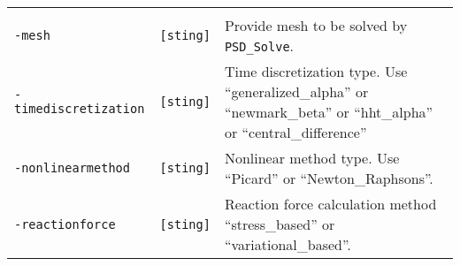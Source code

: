 \begin{longtable}[]{@{}lll@{}}
\begin{minipage}[t]{0.09\columnwidth}
\strut
\end{minipage} & \begin{minipage}[t]{0.56\columnwidth}\raggedright\strut
\strut
\end{minipage}\tabularnewline
\begin{minipage}[t]{0.26\columnwidth}\raggedright\strut
\lstinline!-mesh!\strut
\end{minipage} & \begin{minipage}[t]{0.09\columnwidth}\raggedright\strut
\lstinline![sting]!\strut
\end{minipage} & \begin{minipage}[t]{0.56\columnwidth}\raggedright\strut
Provide mesh to be solved by \lstinline!PSD_Solve!.\strut
\end{minipage}\tabularnewline
\begin{minipage}[t]{0.26\columnwidth}\raggedright\strut
\lstinline!-timediscretization!\strut
\end{minipage} & \begin{minipage}[t]{0.09\columnwidth}\raggedright\strut
\lstinline![sting]!\strut
\end{minipage} & \begin{minipage}[t]{0.56\columnwidth}\raggedright\strut
Time discretization type. Use ``generalized\_alpha'' or
``newmark\_beta'' or ``hht\_alpha'' or ``central\_difference''\strut
\end{minipage}\tabularnewline
\begin{minipage}[t]{0.26\columnwidth}\raggedright\strut
\lstinline!-nonlinearmethod!\strut
\end{minipage} & \begin{minipage}[t]{0.09\columnwidth}\raggedright\strut
\lstinline![sting]!\strut
\end{minipage} & \begin{minipage}[t]{0.56\columnwidth}\raggedright\strut
Nonlinear method type. Use ``Picard'' or ``Newton\_Raphsons''.\strut
\end{minipage}\tabularnewline
\begin{minipage}[t]{0.26\columnwidth}\raggedright\strut
\lstinline!-reactionforce!\strut
\end{minipage} & \begin{minipage}[t]{0.09\columnwidth}\raggedright\strut
\lstinline![sting]!\strut
\end{minipage} & \begin{minipage}[t]{0.56\columnwidth}\raggedright\strut
Reaction force calculation method ``stress\_based'' or
``variational\_based''.\strut

\end{minipage}
\end{longtable}
